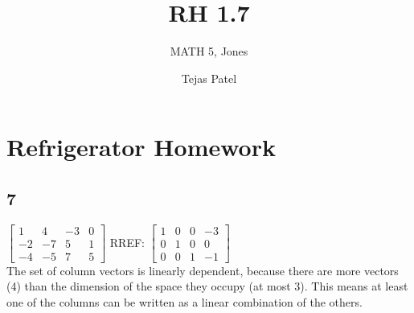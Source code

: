 \documentclass{article}
\title{RH 1.7}
\author{MATH 5, Jones}
\date{Tejas Patel}
\begin{document}
\maketitle
\section*{Refrigerator Homework}
\subsection*{7}

$\begin{bmatrix} 1 & 4 & -3 & 0 \\ -2 & -7 & 5 & 1 \\ -4 & -5 & 7 & 5 \end{bmatrix}$ RREF: 
$\begin{bmatrix}
    1 & 0 & 0 & -3 \\
    0 & 1 & 0 & 0 \\
    0 & 0 & 1 & -1
    \end{bmatrix}$
\\The set of column vectors is linearly dependent, because there are more vectors (4) than the dimension of the space they occupy (at most 3). This means at least one of the columns can be written as a linear combination of the others.
\end{document}
